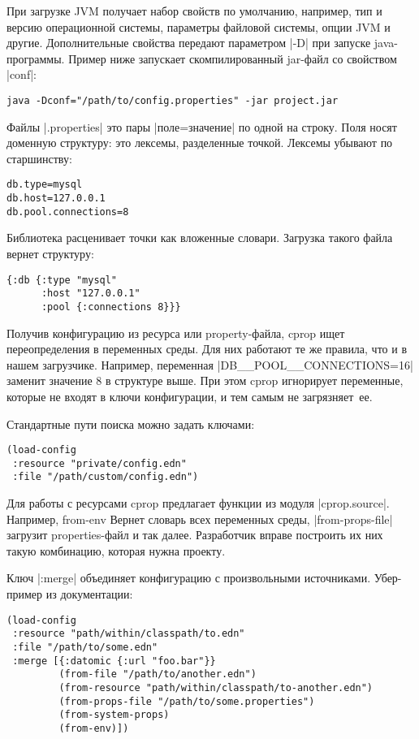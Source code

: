 При загрузке JVM получает набор свойств по умолчанию, например, тип и версию
операционной системы, параметры файловой системы, опции JVM и
другие. Дополнительные свойства передают параметром \spverb|-D| при запуске
java-программы. Пример ниже запускает скомпилированный jar-файл со свойством
\spverb|conf|:

\begin{verbatim}
java -Dconf="/path/to/config.properties" -jar project.jar
\end{verbatim}

Файлы \spverb|.properties| это пары \spverb|поле=значение| по одной на строку. Поля носят
доменную структуру: это лексемы, разделенные точкой. Лексемы убывают по
старшинству:

\begin{verbatim}
db.type=mysql
db.host=127.0.0.1
db.pool.connections=8
\end{verbatim}

Библиотека расценивает точки как вложенные словари. Загрузка такого файла вернет
структуру:

\begin{verbatim}
{:db {:type "mysql"
      :host "127.0.0.1"
      :pool {:connections 8}}}
\end{verbatim}

Получив конфигурацию из ресурса или property-файла, cprop ищет переопределения в
переменных среды. Для них работают те же правила, что и в нашем
загрузчике. Например, переменная \spverb|DB__POOL__CONNECTIONS=16| заменит
значение 8 в структуре выше. При этом cprop игнорирует переменные, которые не
входят в ключи конфигурации, и тем самым не загрязняет~ее.

Стандартные пути поиска можно задать ключами:

\begin{verbatim}
(load-config
 :resource "private/config.edn"
 :file "/path/custom/config.edn")
\end{verbatim}

Для работы с ресурсами cprop предлагает функции из модуля
\spverb|cprop.source|. Например, from-env Вернет словарь всех переменных среды,
\spverb|from-props-file| загрузит properties-файл и так далее. Разработчик вправе
построить их них такую комбинацию, которая нужна проекту.

Ключ \spverb|:merge| объединяет конфигурацию с произвольными источниками. Убер-пример
из документации:

\begin{verbatim}
(load-config
 :resource "path/within/classpath/to.edn"
 :file "/path/to/some.edn"
 :merge [{:datomic {:url "foo.bar"}}
         (from-file "/path/to/another.edn")
         (from-resource "path/within/classpath/to-another.edn")
         (from-props-file "/path/to/some.properties")
         (from-system-props)
         (from-env)])
\end{verbatim}


